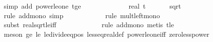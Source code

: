 \begin{isabellebody}
\ {\isacharparenleft}{\kern0pt}simp\ add{\isacharcolon}{\kern0pt}\ power{\isacharunderscore}{\kern0pt}le{\isacharunderscore}{\kern0pt}one\ t{\isacharunderscore}{\kern0pt}ge{\isacharunderscore}{\kern0pt}{}{\isacharparenright}{\kern0pt}{\isacharplus}{\kern0pt}\isanewline
\ \ \ \ \ \ \ \ \isamarkupfalse%
\ \isamarkupfalse%
\ {\isachardoublequoteopen}{\isachardot}{\kern0pt}{\isachardot}{\kern0pt}{\isachardot}{\kern0pt}\ {\isasymle}\ real\ t\ {\isacharminus}{\kern0pt}\ {}{}{\isacharslash}{\kern0pt}\ {\isasymdelta}{\isacharprime}{\kern0pt}\ {\isacharplus}{\kern0pt}\ {}\ {\isacharasterisk}{\kern0pt}\ sqrt\ {\isacharparenleft}{\kern0pt}\ {}{}\ {\isacharslash}{\kern0pt}\ {\isasymdelta}{\isacharprime}{\kern0pt}\ {\isacharplus}{\kern0pt}\ {}\ {\isacharslash}{\kern0pt}\ {\isasymdelta}{\isacharprime}{\kern0pt}\isanewline
\ \ \ \ \ \ \ \ \ \ \isamarkupfalse%
\ {\isacharparenleft}{\kern0pt}rule\ add{\isacharunderscore}{\kern0pt}mono{\isacharcomma}{\kern0pt}\ simp{\isacharparenright}{\kern0pt}\isanewline
\ \ \ \ \ \ \ \ \ \ \isamarkupfalse%
\ {\isacharparenleft}{\kern0pt}rule\ mult{\isacharunderscore}{\kern0pt}left{\isacharunderscore}{\kern0pt}mono{\isacharparenright}{\kern0pt}\isanewline
\ \ \ \ \ \ \ \ \ \ \ \isamarkupfalse%
\ {\isacharparenleft}{\kern0pt}subst\ real{\isacharunderscore}{\kern0pt}sqrt{\isacharunderscore}{\kern0pt}le{\isacharunderscore}{\kern0pt}iff{\isacharparenright}{\kern0pt}\isanewline
\ \ \ \ \ \ \ \ \ \ \ \isamarkupfalse%
\ {\isacharparenleft}{\kern0pt}rule\ add{\isacharunderscore}{\kern0pt}mono{\isacharcomma}{\kern0pt}\ metis\ t{\isacharunderscore}{\kern0pt}le{\isacharunderscore}{\kern0pt}{\isasymdelta}{\isacharprime}{\kern0pt}{\isacharparenright}{\kern0pt}\isanewline
\ \ \ \ \ \ \ \ \ \ \ \isamarkupfalse%
\ {\isacharparenleft}{\kern0pt}meson\ {\isasymdelta}{\isacharprime}{\kern0pt}{\isacharunderscore}{\kern0pt}ge{\isacharunderscore}{\kern0pt}{}\ {\isasymdelta}{\isacharprime}{\kern0pt}{\isacharunderscore}{\kern0pt}le{\isacharunderscore}{\kern0pt}{}\ le{\isacharunderscore}{\kern0pt}divide{\isacharunderscore}{\kern0pt}eq{\isacharunderscore}{\kern0pt}{}{\isacharunderscore}{\kern0pt}pos\ less{\isacharunderscore}{\kern0pt}eq{\isacharunderscore}{\kern0pt}real{\isacharunderscore}{\kern0pt}def\ power{\isacharunderscore}{\kern0pt}le{\isacharunderscore}{\kern0pt}one{\isacharunderscore}{\kern0pt}iff\ zero{\isacharunderscore}{\kern0pt}less{\isacharunderscore}{\kern0pt}power{\isacharparenright}{\kern0pt}\isanewline

\end{isabellebody}
